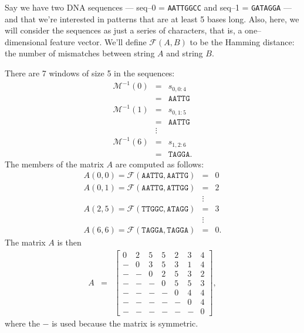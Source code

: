 	\begin{kljEx}
	    Say we have two DNA sequences --- seq--0 = \texttt{AATTGGCC}
	    and seq--1 = \texttt{GATAGGA} --- and that we're interested
	    in patterns that are at least 5 bases long.  Also, here, we
	    will consider the sequences as just a series of characters,
	    that is, a one--dimensional feature vector.  We'll define
	    $\mathscr{F}(A,B)$ to be the Hamming distance: the number
	    of mismatches between string $A$ and string $B$.

	    There are 7 windows of size 5 in the sequences:
		\begin{eqnarray*}
		    \mathscr{M}^{-1}(0) & = &	s_{0,0:4} \\
					& = &	\texttt{AATTG}\\
		    \mathscr{M}^{-1}(1) & = &	s_{0,1:5} \\
					& = &	\texttt{AATTG} \\
					& \vdots & \\
		    \mathscr{M}^{-1}(6) & = &	s_{1,2:6} \\
					& = &	\texttt{TAGGA}.
		\end{eqnarray*}
	    The members of the matrix $A$ are computed as follows:
		\begin{eqnarray*}
		    A(0,0) = \mathscr{F}(\texttt{AATTG},\texttt{AATTG}) & = & 0 \\
		    A(0,1) = \mathscr{F}(\texttt{AATTG},\texttt{ATTGG}) & = & 2 \\
					& \vdots & \\
		    A(2,5) = \mathscr{F}(\texttt{TTGGC},\texttt{ATAGG}) & = & 3 \\
					& \vdots & \\
		    A(6,6) = \mathscr{F}(\texttt{TAGGA},\texttt{TAGGA}) & = & 0.
		\end{eqnarray*}
	    The matrix $A$ is then
		\begin{eqnarray*}
		    A	& = &	\begin{bmatrix}
				    0 & 2 &  5 & 5 & 2 & 3 & 4 \\
				    - & 0 &  3 & 5 & 3 & 1 & 4 \\
				    - & - &  0 & 2 & 5 & 3 & 2 \\
				    - & - &  - & 0 & 5 & 5 & 3 \\
				    - & - &  - & - & 0 & 4 & 4 \\
				    - & - &  - & - & - & 0 & 4 \\
				    - & - &  - & - & - & - & 0
				\end{bmatrix},
		\end{eqnarray*}
	    where the $-$ is used because the matrix is symmetric.
	\end{kljEx}



